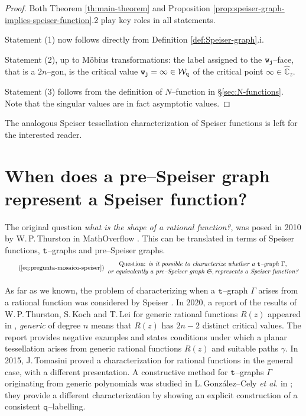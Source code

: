 \documentclass[final,3p,times]{elsarticle}
\newcommand{\CW}{\ensuremath{{\widehat{\mathbb C}}}}
\theoremstyle{definition}
\begin{document}
\begin{proof}
Both Theorem \ref{th:main-theorem} and 
Proposition \ref{prop:speiser-graph-implies-speiser-function}.2 
play key roles in all statements.

Statement (1) now follows directly from Definition \ref{def:Speiser-graph}.i.

Statement (2),
up to M\"obius transformations: 
the label assigned to  
the $\tt w_j$--face, that is a $2n$--gon, is the critical
value ${\tt w}_{\tt j} = \infty\in\mathcal{W}_{\tt q}$ of 
the critical point $\infty \in \CW_z$.

Statement (3)
follows from the definition of $N$--function in 
\S \ref{sec:N-functions}. Note that the singular values
are in fact asymptotic values. 
\end{proof}


The analogous Speiser tessellation characterization of Speiser functions is left for the interested reader. 


\section{When does a pre–Speiser graph represent a Speiser function?}
\label{sec:planar-graphs-Thrurston}
The original question 
\emph{what is the shape of a rational function?}, 
was posed in 2010 by  W.\,P.\,Thurston in MathOverflow \cite{Thurston2}.  
This can be translated in terms of Speiser functions,
$\tt t$--graphs and pre--Speiser graphs.
\begin{equation}
\tag{\ref{eq:pregunta-mosaico-speiser}}
\begin{array}{c}
\text{Question: \it is it possible to characterize whether a {\tt t}--graph }\Gamma, 
\\
\text{\it or equivalently a pre--Speiser graph }\mathfrak{S},
\text{\it represents a Speiser function?}
\end{array}
\end{equation}

\noindent 
As far as we known, 
the problem of characterizing when a 
$\tt t$--graph $\Gamma$
arises from a rational function was considered by 
Speiser \cite{Speiser}.
In 2020, 
a report of the results of W.\,P.\,Thurston, S.\,Koch and T.\,Lei
for generic rational functions
$R(z)$ appeared in \cite{Koch-Lei},
\emph{generic} of degree $n$ means that $R(z)$ has $2n-2$ distinct critical values.
The report provides negative examples and 
states conditions under which a planar
tessellation arises from generic rational functions $R(z)$ and suitable  paths $\gamma$.
In 2015, J.\,Tomasini \cite{Tomasini}
proved a characterization for rational functions
in the general case,
with a different presentation. 
A constructive method
for $\tt t$--graphs $\Gamma$ 
originating from generic polynomials 
was studied in L.\,Gonz\'alez--Cely \emph{et al.}
in \cite{GonzalezMucino};
they provide a different characterization by 
showing an explicit construction of a consistent $\tt q$--labelling. 
\end{document}
